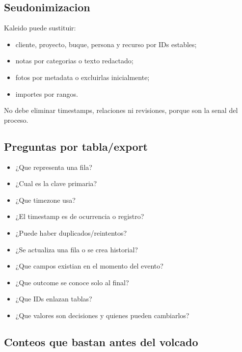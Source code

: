 \documentclass[
  spanish,
  10pt,
  a4paper,
]{article}
\providecommand{\tightlist}{%
  \setlength{\itemsep}{0pt}\setlength{\parskip}{0pt}}
\begin{document}
\subsection{Seudonimizacion}\label{seudonimizacion}

Kaleido puede sustituir:

\begin{itemize}
\tightlist
\item
  cliente, proyecto, buque, persona y recurso por IDs estables;
\item
  notas por categorias o texto redactado;
\item
  fotos por metadata o excluirlas inicialmente;
\item
  importes por rangos.
\end{itemize}

No debe eliminar timestamps, relaciones ni revisiones, porque son la
senal del proceso.

\subsection{Preguntas por tabla/export}\label{preguntas-por-tablaexport}

\begin{itemize}
\tightlist
\item
  ¿Que representa una fila?
\item
  ¿Cual es la clave primaria?
\item
  ¿Que timezone usa?
\item
  ¿El timestamp es de ocurrencia o registro?
\item
  ¿Puede haber duplicados/reintentos?
\item
  ¿Se actualiza una fila o se crea historial?
\item
  ¿Que campos existian en el momento del evento?
\item
  ¿Que outcome se conoce solo al final?
\item
  ¿Que IDs enlazan tablas?
\item
  ¿Que valores son decisiones y quienes pueden cambiarlos?
\end{itemize}

\subsection{Conteos que bastan antes del
volcado}\label{conteos-que-bastan-antes-del-volcado}
\end{document}
